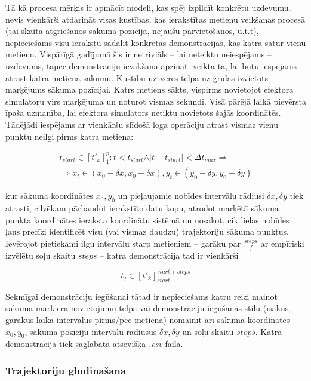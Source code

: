 \documentclass[12pt, a4paper]{article}
\numberwithin{equation}{section} %
\begin{document}
Tā kā procesa mērķis ir apmācīt modeli, kas spēj izpildīt konkrētu uzdevumu, nevis vienkārši atdarināt visas kustības, kas ierakstītas metienu veikšanas procesā (tai skaitā atgriešanos sākuma pozīcijā, nejaušu pārvietošanos, u.t.t), nepieciešams visu ierakstu sadalīt konkrētās demonstrācijās, kas katra satur vienu metienu. Vispārīgā gadījumā šis ir netriviāls -- lai neteiktu neiespējams -- uzdevums, tāpēc demonstrāciju ievākšana apzināti veikta tā, lai būtu iespējams atrast katra metiena sākumu. Kustību uztveres telpā uz grīdas izvietots marķējums sākuma pozīcijai. Katrs metiens sākts, vispirms novietojot efektora simulatoru virs marķējuma un noturot vismaz sekundi. Visā pārējā laikā pievērsta īpaša uzmanība, lai efektora simulators netiktu novietots šajās koordinātēs. Tādējādi iespējams ar vienkāršu slīdošā loga operāciju atrast vismaz vienu punktu neilgi pirms katra metiena:

\begin{multline}
    t_{start} \in [t'_{k}]^p_1: t < t_{start} \land \vert t - t_{start} \vert < \Delta t_{max} \Rightarrow \\ \Rightarrow x_t \in (x_{0} - \delta x, x_{0} + \delta x ), y_t \in  (y_{0} - \delta y, y_{0} + \delta y )
\end{multline}

kur sākuma koordinātes $x_0, y_0$ un pieļaujamie nobīdes intervālu rādiusi $\delta x, \delta y$ tiek atrasti, cilvēkam pārbaudot ierakstīto datu kopu, atrodot marķētā sākuma punkta koordinātes ieraksta koordinātu sistēmā un nosakot, cik lielas nobīdes ļaus precīzi identificēt visu (vai vismaz daudzu) trajektoriju sākuma punktus. Ievērojot pietiekami ilgu intervālu starp metieniem -- garāku par $\frac{steps}{f}$ ar empīriski izvēlētu soļu skaitu $steps$ --  katra demonstrācija tad ir vienkārši 

\begin{equation}
    t_{j} \in [t'_{k}]^{start+steps}_{start}
\end{equation}

Sekmīgai demonstrāciju iegūšanai tātad ir nepieciešams katru reizi mainot sākuma marķiera novietojumu telpā vai demonstrāciju iegūšanas stilu (īsākus, garākus laika intervālus pirms/pēc metiena) nomainīt arī sākuma koordinātes $x_0, y_0$, sākuma pozīciju intervālu rādiusus $\delta x, \delta y$ un soļu skaitu $steps$. Katra demonstrācija tiek saglabāta atsevišķā \textit{.csv} failā.

\subsubsection{Trajektoriju gludināšana}
\end{document}
